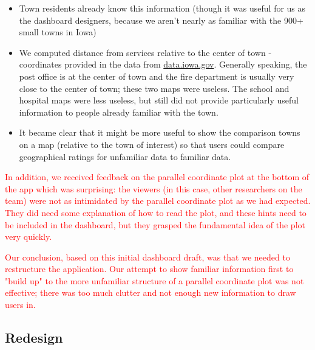 \documentclass[letterpaper,inpress]{jdsart}
\providecommand{\tightlist}{%
  \setlength{\itemsep}{0pt}\setlength{\parskip}{0pt}}
\begin{document}
\begin{itemize}
\tightlist
\item
  Town residents already know this information (though it was useful for us as the dashboard designers, because we aren't nearly as familiar with the 900+ small towns in Iowa)
\item
  We computed distance from services relative to the center of town - coordinates provided in the data from \url{data.iowa.gov}. Generally speaking, the post office is at the center of town and the fire department is usually very close to the center of town; these two maps were useless. The school and hospital maps were less useless, but still did not provide particularly useful information to people already familiar with the town.
\item
  It became clear that it might be more useful to show the comparison towns on a map (relative to the town of interest) so that users could compare geographical ratings for unfamiliar data to familiar data.
\end{itemize}

{\textcolor{red}{In addition, we received feedback on the parallel coordinate plot at the bottom of the app which was surprising: the viewers (in this case, other researchers on the team) were not as intimidated by the parallel coordinate plot as we had expected. They did need some explanation of how to read the plot, and these hints need to be included in the dashboard, but they grasped the fundamental idea of the plot very quickly.}}

{\textcolor{red}{Our conclusion, based on this initial dashboard draft, was that we needed to restructure the application. Our attempt to show familiar information first to "build up" to the more unfamiliar structure of a parallel coordinate plot was not effective; there was too much clutter and not enough new information to draw users in.}}

\hypertarget{redesign}{%
\subsection{Redesign}\label{redesign}}
\end{document}
